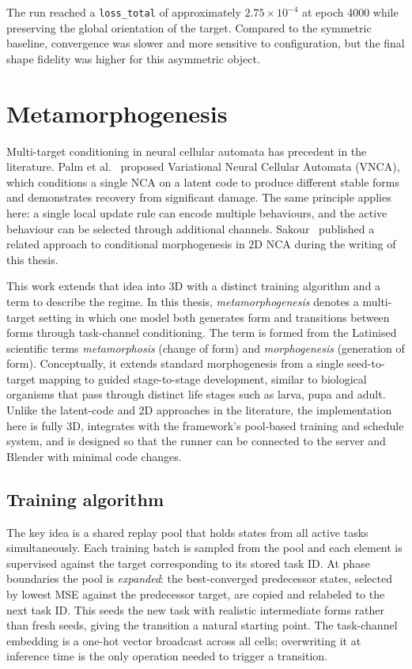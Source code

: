 The run reached a \texttt{loss\_total} of approximately $2.75 \times 10^{-4}$
at epoch 4000 while preserving the global orientation of the target. Compared
to the symmetric baseline, convergence was slower and more sensitive to
configuration, but the final shape fidelity was higher for this asymmetric
object.

\clearpage
 
\section{Metamorphogenesis}

Multi-target conditioning in neural cellular automata has precedent in the
literature. Palm et al.~\cite{Palm2022VNCA} proposed Variational Neural
Cellular Automata (VNCA), which conditions a single NCA on a latent code to
produce different stable forms and demonstrates recovery from significant
damage. The same principle applies here: a single local update rule
can encode multiple behaviours, and the active behaviour can be selected
through additional channels. Sakour~\cite{Sakour2025} published a related
approach to conditional morphogenesis in 2D NCA during the writing of this
thesis.

This work extends that idea into 3D with a distinct training algorithm and a
term to describe the regime. In this thesis, \textit{metamorphogenesis}
denotes a multi-target setting in which one model both generates form and
transitions between forms through task-channel conditioning. The term is
formed from the Latinised scientific terms \textit{metamorphosis} (change of
form) and \textit{morphogenesis} (generation of form). Conceptually, it
extends standard morphogenesis from a single seed-to-target mapping to
guided stage-to-stage development, similar to biological organisms that pass
through distinct life stages such as larva, pupa and adult. Unlike the
latent-code and 2D approaches in the literature, the implementation here is
fully 3D, integrates with the framework's pool-based training and schedule
system, and is designed so that the runner can be connected to the server and
Blender with minimal code changes.

\subsection{Training algorithm}

The key idea is a shared replay pool that holds states from all active tasks
simultaneously. Each training batch is sampled from the pool and each element
is supervised against the target corresponding to its stored task ID. At phase
boundaries the pool is \textit{expanded}: the best-converged predecessor
states, selected by lowest MSE against the predecessor target, are copied and
relabeled to the next task ID. This seeds the new task with realistic
intermediate forms rather than fresh seeds, giving the transition a natural
starting point. The task-channel embedding is a one-hot vector broadcast
across all cells; overwriting it at inference time is the only operation
needed to trigger a transition.

